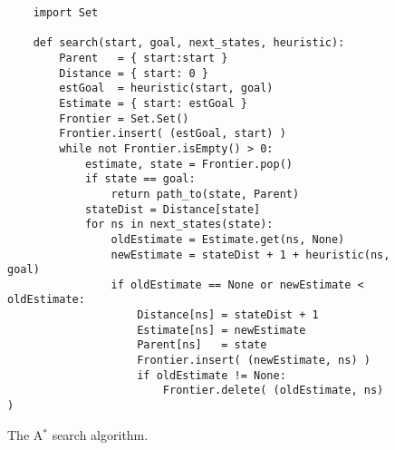 \begin{figure}[!ht]
\centering
\begin{verbatim}
    import Set

    def search(start, goal, next_states, heuristic):
        Parent   = { start:start }
        Distance = { start: 0 }           
        estGoal  = heuristic(start, goal)
        Estimate = { start: estGoal }
        Frontier = Set.Set()
        Frontier.insert( (estGoal, start) )
        while not Frontier.isEmpty() > 0:
            estimate, state = Frontier.pop()
            if state == goal:
                return path_to(state, Parent)
            stateDist = Distance[state]
            for ns in next_states(state):
                oldEstimate = Estimate.get(ns, None)
                newEstimate = stateDist + 1 + heuristic(ns, goal)
                if oldEstimate == None or newEstimate < oldEstimate:
                    Distance[ns] = stateDist + 1
                    Estimate[ns] = newEstimate
                    Parent[ns]   = state
                    Frontier.insert( (newEstimate, ns) )
                    if oldEstimate != None:
                        Frontier.delete( (oldEstimate, ns) )
\end{verbatim}
\vspace*{-0.3cm}
\caption{The A$^*$ search algorithm.}
\label{fig:A-Star-Search.ipynb}
\end{figure}

